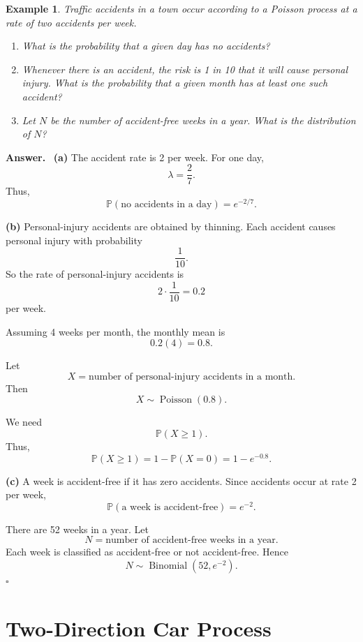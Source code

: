 \documentclass[12pt,a4paper]{article}
\theoremstyle{lecturestyle}
\newtheorem{example}{Example}
\newenvironment{answer}
{\par\textbf{Answer.}\ }
{\hfill$\square$\par}
\newcommand{\Prob}{\mathbb{P}}
\begin{document}
\begin{example}
Traffic accidents in a town occur according to a Poisson process at a rate of two accidents per week.

\begin{enumerate}[label=(\alph*)]
    \item What is the probability that a given day has no accidents?
    \item Whenever there is an accident, the risk is 1 in 10 that it will cause personal injury. What is the probability that a given month has at least one such accident?
    \item Let $N$ be the number of accident-free weeks in a year. What is the distribution of $N$?
\end{enumerate}
\end{example}

\begin{answer}
\textbf{(a)} The accident rate is 2 per week. For one day,
\[
\lambda=\frac27.
\]
Thus,
\[
\Prob(\text{no accidents in a day})
=
e^{-2/7}.
\]

\textbf{(b)} Personal-injury accidents are obtained by thinning. Each accident causes personal injury with probability
\[
\frac1{10}.
\]
So the rate of personal-injury accidents is
\[
2\cdot\frac1{10}=0.2
\]
per week.

Assuming 4 weeks per month, the monthly mean is
\[
0.2(4)=0.8.
\]

Let
\[
X=\text{number of personal-injury accidents in a month}.
\]
Then
\[
X\sim \operatorname{Poisson}(0.8).
\]

We need
\[
\Prob(X\geq 1).
\]
Thus,
\[
\Prob(X\geq1)=1-\Prob(X=0)=1-e^{-0.8}.
\]

\textbf{(c)} A week is accident-free if it has zero accidents. Since accidents occur at rate 2 per week,
\[
\Prob(\text{a week is accident-free})=e^{-2}.
\]

There are 52 weeks in a year. Let
\[
N=\text{number of accident-free weeks in a year}.
\]
Each week is classified as accident-free or not accident-free. Hence
\[
N\sim \operatorname{Binomial}(52,e^{-2}).
\]
\end{answer}

\section{Two-Direction Car Process}
\end{document}

